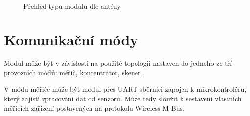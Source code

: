 \begin{figure}[!ht]
    \centering
			\hspace*{5mm}
			\hspace*{5mm}
		\caption{Přehled typu modulu dle antény \cite{ModulIQRF}}
		\label{ObrazekAnteny}
		\vspace{-20pt}
\end{figure}

\section{Komunikační módy}
\label{KapKomMody}

Modul může být v závislosti na použité topologii nastaven do jednoho ze tří provozních módů: měřič, koncentrátor, skener \cite{ModulIQRF}. 

V módu měřiče může být modul přes UART sběrnici zapojen k mikrokontroléru, který zajistí zpracování dat od senzorů. Může tedy sloužit k sestavení vlastních měřicích zařízení postavených na protokolu Wireless M-Bus.

